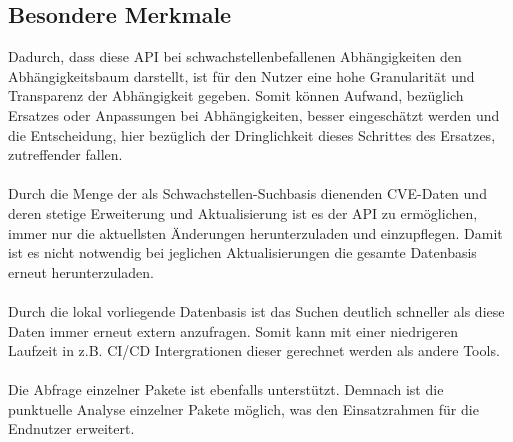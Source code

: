 \subsection{Besondere Merkmale} \label{sec:Besondere Merkmale}
    Dadurch, dass diese API bei schwachstellenbefallenen Abhängigkeiten den Abhängigkeitsbaum darstellt, ist für den Nutzer eine hohe Granularität und Transparenz der Abhängigkeit gegeben.
    Somit können Aufwand, bezüglich Ersatzes oder Anpassungen bei Abhängigkeiten, besser eingeschätzt werden und die Entscheidung, hier bezüglich der Dringlichkeit dieses Schrittes des Ersatzes, zutreffender fallen.
    \\ \\
    Durch die Menge der als Schwachstellen-Suchbasis dienenden CVE-Daten und deren stetige Erweiterung und Aktualisierung ist es der API zu ermöglichen, immer nur die aktuellsten Änderungen herunterzuladen und einzupflegen.
    Damit ist es nicht notwendig bei jeglichen Aktualisierungen die gesamte Datenbasis erneut herunterzuladen.
    \\ \\
    Durch die lokal vorliegende Datenbasis ist das Suchen deutlich schneller als diese Daten immer erneut extern anzufragen.
    Somit kann mit einer niedrigeren Laufzeit in z.B. CI/CD Intergrationen dieser gerechnet werden als andere Tools.
    \\ \\
    Die Abfrage einzelner Pakete ist ebenfalls unterstützt.
    Demnach ist die punktuelle Analyse einzelner Pakete möglich, was den Einsatzrahmen für die Endnutzer erweitert.
